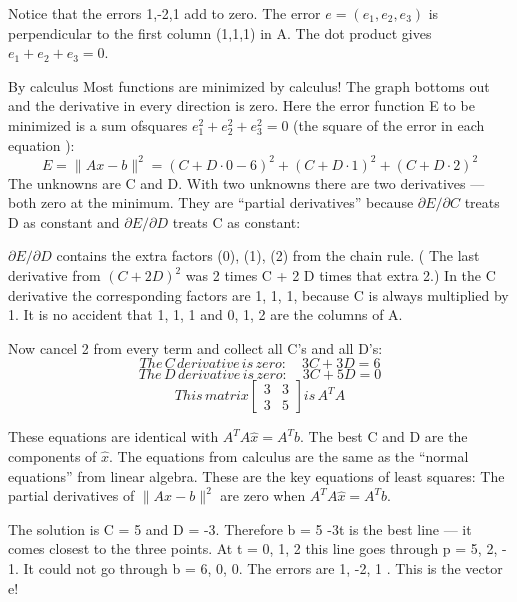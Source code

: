 	Notice that the errors 1,-2,1 add to zero. The error $e=(e_1,e_2,e_3)$ is perpendicular to the first column (1,1,1) in A. The dot product gives $e_1+e_2+e_3=0$.
	
	By calculus Most functions are minimized by calculus! The graph bottoms out and the
	derivative in every direction is zero. Here the error function E to be minimized is a sum ofsquares $e^2_1+e^2_2+e^2_3=0$ (the square of the error in each equation ):
	\begin{equation}
	E=\|Ax-b\|^2=(C+D\cdot 0-6)^2+(C+D\cdot 1)^2+(C+D\cdot 2)^2
	\end{equation}
	The unknowns are C and D. With two unknowns there are two derivatives — both zero
	at the minimum. They are “partial derivatives” because $\partial E/\partial C$ treats D as constant and $\partial E/\partial D$ treats C as constant:
	
	$\partial E/\partial D$ contains the extra factors (0), (1), (2) from the chain rule. ( The last derivative from $(C+2D)^2$ was 2 times C + 2 D times that extra 2.) In the C derivative the corresponding factors are 1, 1, 1, because C is always multiplied by 1. It is no accident that 1, 1, 1 and 0, 1, 2 are the columns of A.
	
	Now cancel 2 from every term and collect all C's and all D's:
	\begin{equation}
	The\, C \,derivative\, is\, zero: \quad 3C+3D=6
	\end{equation} 
	\begin{equation*}
	The\, D \,derivative\, is\, zero: \quad 3C+5D=0 
	\end{equation*}
	\begin{equation*}
	This\,matrix
	\begin{bmatrix}
	3 & 3 \\ 3 & 5
	\end{bmatrix}
	is \,A^TA
	\end{equation*}   
	
	These equations are identical with $A^TA\hat{x}=A^Tb$. The best C and D are the components of $\hat{x}$. The equations from calculus are the same as the “normal equations” from linear algebra. These are the key equations of least squares: The partial derivatives of $\|Ax-b\|^2$ are zero when $A^TA\hat{x}=A^Tb$.
	
	The solution is C = 5 and D = -3. Therefore b = 5 -3t is the best line — it comes
	closest to the three points. At t = 0, 1, 2 this line goes through p = 5, 2, - 1. It could not go through b = 6, 0, 0. The errors are 1, -2, 1 . This is the vector e!
	
